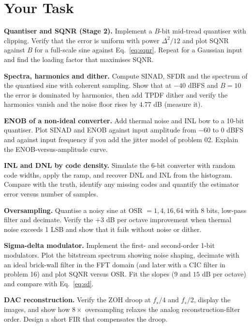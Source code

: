 \documentclass[11pt,a4paper]{article}
\begin{document}
\section*{Your Task}
\begin{tasks}
  \item \textbf{Quantiser and SQNR (Stage 2).} Implement a $B$-bit mid-tread quantiser with clipping. Verify that the error is uniform with power $\Delta^2/12$ and plot SQNR against $B$ for a full-scale sine against Eq.~\eqref{eq:sqnr}. Repeat for a Gaussian input and find the loading factor that maximises SQNR.
  \item \textbf{Spectra, harmonics and dither.} Compute SINAD, SFDR and the spectrum of the quantised sine with coherent sampling. Show that at $-40$ dBFS and $B=10$ the error is dominated by harmonics, then add TPDF dither and verify the harmonics vanish and the noise floor rises by $4.77$ dB (measure it).
  \item \textbf{ENOB of a non-ideal converter.} Add thermal noise and INL bow to a 10-bit quantiser. Plot SINAD and ENOB against input amplitude from $-60$ to $0$ dBFS and against input frequency if you add the jitter model of problem 02. Explain the ENOB-versus-amplitude curve.
  \item \textbf{INL and DNL by code density.} Simulate the 6-bit converter with random code widths, apply the ramp, and recover DNL and INL from the histogram. Compare with the truth, identify any missing codes and quantify the estimator error versus number of samples.
  \item \textbf{Oversampling.} Quantise a noisy sine at OSR $=1,4,16,64$ with 8 bits, low-pass filter and decimate. Verify the $+3$ dB per octave improvement when thermal noise exceeds 1 LSB and show that it fails without noise or dither.
  \item \textbf{Sigma-delta modulator.} Implement the first- and second-order 1-bit modulators. Plot the bitstream spectrum showing noise shaping, decimate with an ideal brick-wall filter in the FFT domain (and later with a CIC filter in problem 16) and plot SQNR versus OSR. Fit the slopes ($9$ and $15$ dB per octave) and compare with Eq.~\eqref{eq:sd}.
  \item \textbf{DAC reconstruction.} Verify the ZOH droop at $f_s/4$ and $f_s/2$, display the images, and show how $8\times$ oversampling relaxes the analog reconstruction-filter order. Design a short FIR that compensates the droop.
\end{tasks}
\end{document}
